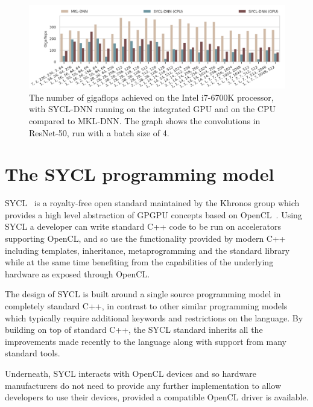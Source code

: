 \documentclass[sigconf]{acmart}
\begin{document}
\begin{figure}
  \includegraphics{pictures/intel_resnet.png}
  \caption{The number of gigaflops achieved on the Intel i7-6700K processor, with
  SYCL-DNN running on the integrated GPU and on the CPU compared to MKL-DNN\@.
  The graph shows the convolutions in ResNet-50, run with a batch size of 4.}%
  \label{fig:intel_resnet}
\end{figure}

\section{The SYCL programming model}

SYCL~\cite{sycl} is a royalty-free open standard maintained by the Khronos group
which provides a high level abstraction of GPGPU concepts based on
OpenCL~\cite{opencl}. Using SYCL a developer can write standard C++ code to be
run on accelerators supporting OpenCL, and so use the functionality
provided by modern C++ including templates, inheritance, metaprogramming and the
standard library while at the same time benefiting from the capabilities of the
underlying hardware as exposed through OpenCL\@.

The design of SYCL is built around a single source programming model in
completely standard C++, in contrast to other similar programming models which
typically require additional keywords and restrictions on the language. By
building on top of standard C++, the SYCL standard inherits all the improvements
made recently to the language along with support from many standard tools.

Underneath, SYCL interacts with OpenCL devices and so hardware manufacturers do
not need to provide any further implementation to allow developers to use their
devices, provided a compatible OpenCL driver is available.
\end{document}

